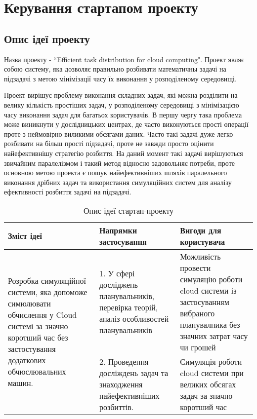 
\chapter{Керування стартапом проекту}
\section{Опис ідеї проекту}
Назва проекту - ``Efficient task distribution for cloud computing". Проект являє собою систему, яка дозволяє правильно розбивати математичны задачі на підзадачі з метою мінімізації часу їх виконання у розподіленому середовищі.

Проект вирішує проблему виконання складних задач, які можна розділити на велику кількість простіших задач, у розподіленому середовищі з мінімізацією часу виконання задач для багатьох користувачів. В першу чергу така проблема може виникнути у дослідницьких центрах, де часто виконуються прості операції проте з неймовірно виликими обсягами даних. Часто такі задачі дуже легко розбивати на більш прості підзадачі, проте не завжди просто оцінити найефективнішу стратегію розбиття. На даний момент такі задачі вирішуються звичайним паралелізмом і такий метод відносно задовольняє потреби, проте основною метою проекта є пошук найефективніших шляхів паралельного виконання дрібних задач та використання симуляційних систем для аналізу ефективності розбиття задачі на підзадачі. 

\begin{table}[H]
	\centering
	\caption{Опис ідеї стартап-проекту}
	\begin{center}
		\begin{tabular}{|p{5cm}|p{5cm}|p{5cm}|}
			\hline
			\bf{Зміст ідеї} & \bf{Напрямки застосування} & \bf{Вигоди для користувача}
			\\ \hline
			\multirow{2}{5cm}{
				Розробка симуляційної системи, яка допоможе симюлювати
				обчислення у Cloud системі за значно коротший час без застостування додаткових обчюслювальних машин.
			}                           
			& 1. У сфері досліджень планувальників, перевірка теорій, аналіз особливостей планувальників
			& Можливість провести симуляцію роботи cloud системи із застосуванням вибраного планувалника без значних затрат часу чи грошей
			\\ \cline{2-3}
			
			& 2. Проведення досліждень задач та знаходження найефективніших розбиттів.
			& Симуляція роботи cloud системи при великих обсягах задач за значно коротший час
			\\ \hline
		\end{tabular}
	\end{center}
\end{table}

